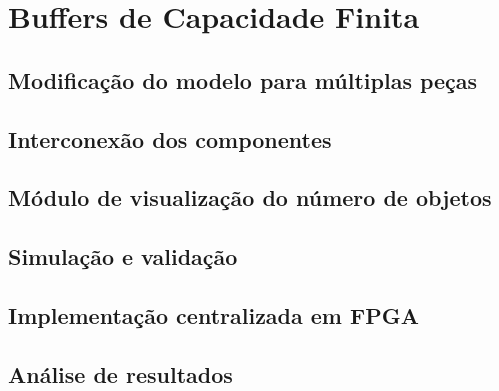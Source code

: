 \section{Buffers de Capacidade Finita}

\subsection{Modificação do modelo para múltiplas peças}

\subsection{Interconexão dos componentes}

\subsection{Módulo de visualização do número de objetos}

\subsection{Simulação e validação}

\subsection{Implementação centralizada em FPGA}

\subsection{Análise de resultados}


